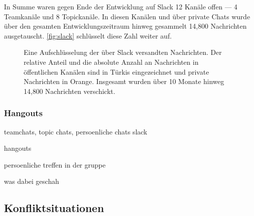 In Summe waren gegen Ende der Entwicklung auf Slack 12 Kanäle offen --- 4
Teamkanäle und 8 Topickanäle. In diesen Kanälen und über private Chats wurde
über den gesamten Entwicklungszeitraum hinweg gesammelt 14,800 Nachrichten
ausgetauscht. \autoref{fig:slack} schlüsselt diese Zahl weiter auf.

\begin{figure}
  \centering
  \caption{Eine Aufschlüsselung der über Slack versandten
  Nachrichten. Der relative Anteil und die absolute Anzahl an Nachrichten in
  öffentlichen Kanälen sind in Türkis eingezeichnet und private Nachrichten in
  Orange. Insgesamt wurden über 10 Monate hinweg 14,800 Nachrichten verschickt.}
  \label{fig:slack}
\end{figure}

\subsubsection{Hangouts}
\label{team:orga-dyno-slack}

teamchats, topic chats, persoenliche chats
slack

hangouts

persoenliche treffen in der gruppe

was dabei geschah

\subsection{Konfliktsituationen}
\label{team:orga-conflict}
